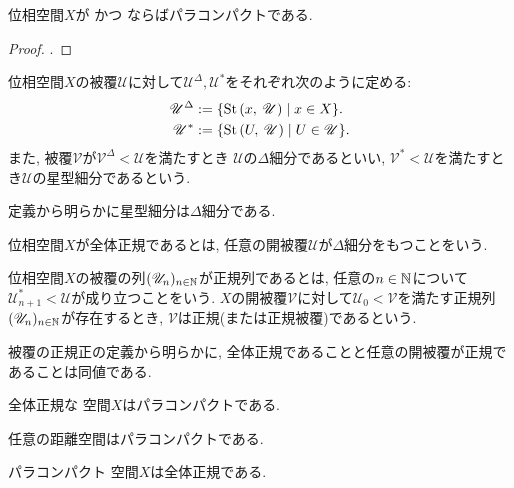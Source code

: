 \documentclass[uplatex, dvipdfmx, a4paper, 12pt, class=jsbook, crop=false]{standalone}
\begin{document}
\begin{theorem}
	\label{p00005}
	位相空間$ X $が  かつ \Lindelof ならばパラコンパクトである.
\end{theorem}
\begin{proof}
	\WIP.
\end{proof}

\begin{definition}
	位相空間$ X $の被覆$ \mathscr{U} $に対して$ \mathscr{U}^\Delta, \mathscr{U}^* $をそれぞれ次のように定める:
	\begin{align*}
		\mathscr{U}^\Delta & \defeq \setcomp{\starset{x}{\mathscr{U}}}{x \in X}. \\
		\mathscr{U}^* & \defeq \setcomp{\starset{U}{\mathscr{U}}}{U \in \mathscr{U}}.
	\end{align*}
	また, 被覆$ \mathscr{V} $が$ \mathscr{V}^\Delta < \mathscr{U} $を満たすとき
	$ \mathscr{U} $の$ \Delta $細分であるといい,
	$ \mathscr{V}^* < \mathscr{U} $を満たすとき$ \mathscr{U} $の星型細分であるという.
\end{definition}
定義から明らかに星型細分は$ \Delta $細分である.

\begin{definition}
	位相空間$ X $が全体正規であるとは, 任意の開被覆$ \mathscr{U} $が$ \Delta $細分をもつことをいう.
\end{definition}

\begin{definition}
	位相空間$ X $の被覆の列$ (\mathscr{U}_n)_{n \in \mathbb{N}} $が正規列であるとは,
	任意の$ n \in \mathbb{N}  $について$ \mathscr{U}_{n+1}^* < \mathscr{U} $が成り立つことをいう.
	$ X $の開被覆$ \mathscr{V} $に対して$ \mathscr{U}_0 < \mathscr{V} $を満たす正規列
	$ (\mathscr{U}_n)_{n \in \mathbb{N}} $が存在するとき,
	$ \mathscr{V} $は正規(または正規被覆)であるという.
\end{definition}

被覆の正規正の定義から明らかに, 全体正規であることと任意の開被覆が正規であることは同値である.

\begin{theorem}
	全体正規な  空間$ X $はパラコンパクトである.
\end{theorem}

\begin{theorem}
	任意の距離空間はパラコンパクトである.
\end{theorem}

\begin{theorem}
	パラコンパクト  空間$ X $は全体正規である.
\end{theorem}
\end{document}
